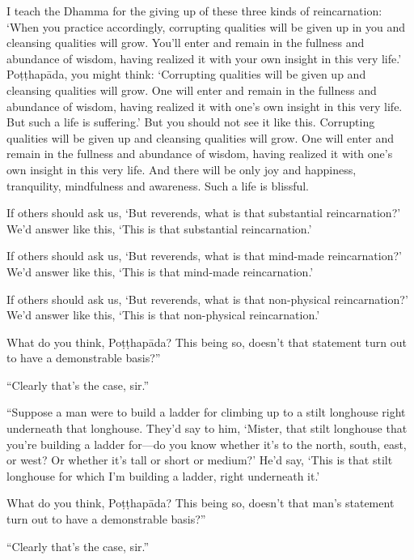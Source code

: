 \documentclass[12pt,openany]{book}%
\begin{document}
I teach the Dhamma for the giving up of these three kinds of reincarnation: ‘When you practice accordingly, corrupting qualities will be given up in you and cleansing qualities will grow. You’ll enter and remain in the fullness and abundance of wisdom, having realized it with your own insight in this very life.’ \textsanskrit{Poṭṭhapāda}, you might think: ‘Corrupting qualities will be given up and cleansing qualities will grow. One will enter and remain in the fullness and abundance of wisdom, having realized it with one’s own insight in this very life. But such a life is suffering.’ But you should not see it like this. Corrupting qualities will be given up and cleansing qualities will grow. One will enter and remain in the fullness and abundance of wisdom, having realized it with one’s own insight in this very life. And there will be only joy and happiness, tranquility, mindfulness and awareness. Such a life is blissful. 

If others should ask us, ‘But reverends, what is that substantial reincarnation?’ We’d answer like this, ‘This is that substantial reincarnation.’ 

If others should ask us, ‘But reverends, what is that mind-made reincarnation?’ We’d answer like this, ‘This is that mind-made reincarnation.’ 

If others should ask us, ‘But reverends, what is that non-physical reincarnation?’ We’d answer like this, ‘This is that non-physical reincarnation.’ 

What do you think, \textsanskrit{Poṭṭhapāda}? This being so, doesn’t that statement turn out to have a demonstrable basis?” 

“Clearly that’s the case, sir.” 

“Suppose a man were to build a ladder for climbing up to a stilt longhouse right underneath that longhouse. They’d say to him, ‘Mister, that stilt longhouse that you’re building a ladder for—do you know whether it’s to the north, south, east, or west? Or whether it’s tall or short or medium?’ He’d say, ‘This is that stilt longhouse for which I’m building a ladder, right underneath it.’ 

What do you think, \textsanskrit{Poṭṭhapāda}? This being so, doesn’t that man’s statement turn out to have a demonstrable basis?” 

“Clearly that’s the case, sir.” 
\end{document}
